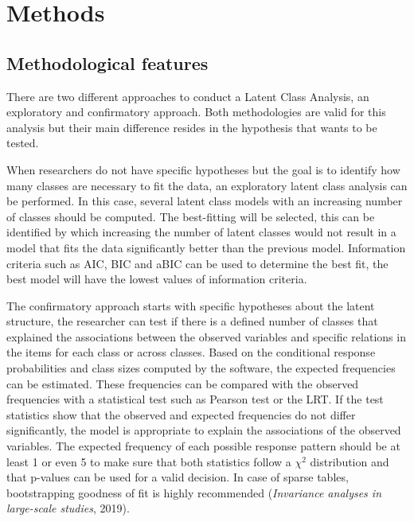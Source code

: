 \documentclass[12pt,a4paper,oneside]{reedthesis}
\begin{document}
\clearpage

\hypertarget{methods}{%
\chapter{Methods}\label{methods}}

\hypertarget{methodological-features}{%
\section{Methodological features}\label{methodological-features}}

There are two different approaches to conduct a Latent Class Analysis, an exploratory and confirmatory approach. Both methodologies are valid for this analysis but their main difference resides in the hypothesis that wants to be tested.

When researchers do not have specific hypotheses but the goal is to identify how many classes are necessary to fit the data, an exploratory latent class analysis can be performed. In this case, several latent class models with an increasing number of classes should be computed. The best-fitting will be selected, this can be identified by which increasing the number of latent classes would not result in a model that fits the data significantly better than the previous model. Information criteria such as AIC, BIC and aBIC can be used to determine the best fit, the best model will have the lowest values of information criteria.

The confirmatory approach starts with specific hypotheses about the latent structure, the researcher can test if there is a defined number of classes that explained the associations between the observed variables and specific relations in the items for each class or across classes. Based on the conditional response probabilities and class sizes computed by the software, the expected frequencies can be estimated. These frequencies can be compared with the observed frequencies with a statistical test such as Pearson test or the LRT. If the test statistics show that the observed and expected frequencies do not differ significantly, the model is appropriate to explain the associations of the observed variables. The expected frequency of each possible response pattern should be at least 1 or even 5 to make sure that both statistics follow a \(\chi^2\) distribution and that p-values can be used for a valid decision. In case of sparse tables, bootstrapping goodness of fit is highly recommended (\emph{Invariance analyses in large-scale studies}, 2019).
\end{document}
